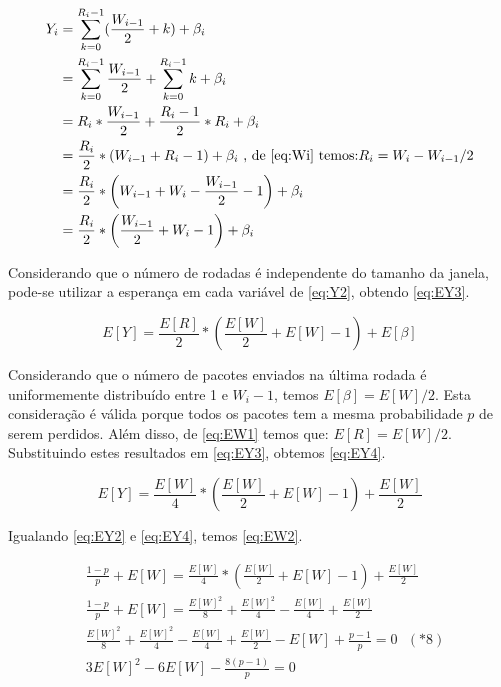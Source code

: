 \begin{align} \label{eq:Y2}
\nonumber Y_i &= \sum_{k = 0}^{R_i - 1} (\frac{W_{i - 1}}{2} + k) + \beta_i \\
\nonumber &= \sum_{k = 0}^{R_i - 1} \frac{W_{i - 1}}{2} + \sum_{k = 0}^{R_i - 1} k + \beta_i \\
\nonumber &= R_i * \frac{W_{i - 1}}{2} + \frac{R_i - 1}{2} * R_i + \beta_i \\
\nonumber &= \frac{R_i}{2} * (W_{i - 1} + R_i - 1) + \beta_i \text{ , de \eqref{eq:Wi} temos:$R_i = W_i - W_{i-1}/2$} \\
\nonumber &= \frac{R_i}{2} * \left(W_{i - 1} + W_i - \frac{W_{i-1}}{2} - 1\right) + \beta_i \\
&= \frac{R_i}{2} * \left(\frac{W_{i-1}}{2} + W_i - 1\right) + \beta_i 
\end{align}

Considerando que o número de rodadas é independente do tamanho da janela, pode-se utilizar
a esperança em cada variável de \eqref{eq:Y2}, obtendo \eqref{eq:EY3}.

\begin{equation} \label{eq:EY3}
E[Y] = \frac{E[R]}{2} * \left(\frac{E[W]}{2} + E[W] - 1\right) + E[\beta] 
\end{equation}

Considerando que o número de pacotes enviados na última rodada é uniformemente distribuído entre
1 e $W_i - 1$, temos $E[\beta] = E[W]/2$. Esta consideração é válida porque todos os pacotes tem 
a mesma probabilidade $p$ de serem perdidos. Além disso, de \eqref{eq:EW1} temos que: $E[R]=E[W]/2$.
Substituindo estes resultados em \eqref{eq:EY3}, obtemos \eqref{eq:EY4}.

\begin{equation} \label{eq:EY4}
E[Y] = \frac{E[W]}{4} * \left(\frac{E[W]}{2} + E[W] - 1\right) + \frac{E[W]}{2}
\end{equation}

Igualando \eqref{eq:EY2} e \eqref{eq:EY4}, temos \eqref{eq:EW2}.

\begin{align} \label{eq:EW2}
\nonumber & \frac{1 - p}{p} + E[W] = \frac{E[W]}{4} * \left(\frac{E[W]}{2} + E[W] - 1\right) + \frac{E[W]}{2} \\
\nonumber & \frac{1 - p}{p} + E[W] = \frac{E[W]^2}{8} + \frac{E[W]^2}{4} - \frac{E[W]}{4} + \frac{E[W]}{2} \\
\nonumber & \frac{E[W]^2}{8} + \frac{E[W]^2}{4} - \frac{E[W]}{4} + \frac{E[W]}{2} - E[W] + \frac{p - 1}{p} = 0 \text{   $(*8)$}\\
& 3E[W]^2 - 6E[W] - \frac{8(p - 1)}{p} = 0
\end{align}

